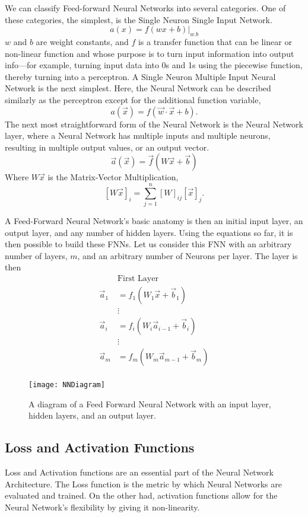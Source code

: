 We can classify Feed-forward Neural Networks into several categories. One of these categories, the simplest, is the Single Neuron Single Input Network. 
$$a(x)=f(wx + b)|_{w.b}$$
$w$ and $b$ are weight constants, and $f$ is a transfer function that can be linear or non-linear function and whose purpose is to turn input information into output info—for example, turning input data into 0s and 1s using the piecewise function, thereby turning into a perceptron. A Single Neuron Multiple Input Neural Network is the next simplest. Here, the Neural Network can be described similarly as the perceptron except for the additional function variable, $$a(\vec{x})=f(\vec{w}\cdot \vec{x}+b).$$ The next most straightforward form of the Neural Network is the Neural Network layer, where a Neural Network has multiple inputs and multiple neurons, resulting in multiple output values, or an output vector. 
$$\vec{a}(\vec{x})=\vec{f}(W\vec{x}+\vec{b})$$ Where $W\vec{x}$ is the Matrix-Vector Multiplication, $$[W\vec{x}]_i=\sum_{j=1}^n [W]_{ij}[\vec{x}]_{j}.$$ 

A Feed-Forward Neural Network's basic anatomy is then an initial input layer, an output layer, and any number of hidden layers. Using the equations so far, it is then possible to build these FNNs. Let us consider this FNN with an arbitrary number of layers, $m$, and an arbitrary number of Neurons per layer. The layer is then 
\begin{align*}
&\text{First Layer} \\
\vec{a}_1 &= f_1(W_1\vec{x} +\vec{b}_1 )\\
&\vdots\\
\vec{a}_i &= f_i(W_i\vec{a}_{i-1}+\vec{b}_i)\\
&\vdots\\
\vec{a}_m &= f_m(W_m\vec{a}_{m-1}+\vec{b}_m)\\
\end{align*}

\begin{figure}
	\centering
	\texttt{[image: NNDiagram]}
	\caption{A diagram of a Feed Forward Neural Network with an input layer, hidden layers, and an output layer.}
	\label{fig:NNDiagram}
\end{figure}

\subsection{Loss and Activation Functions}

Loss and Activation functions are an essential part of the Neural Network Architecture. The Loss function is the metric by which Neural Networks are evaluated and trained. On the other had, activation functions allow for the Neural Network's flexibility by giving it non-linearity.

